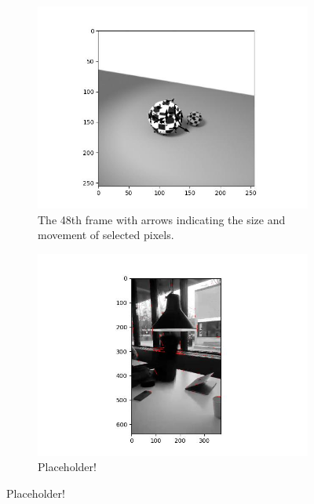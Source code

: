 \documentclass{article}
\begin{document}
\begin{figure}[H]
    \begin{subfigure}{.5\textwidth}
        \centering
        \includegraphics[scale=0.4]{code/toyProblem_F22_vectorField/48.jpg}
        \caption{The 48th frame with arrows indicating the size and movement of selected pixels.}
        \label{fig:moving-ball}
    \end{subfigure}%
    \begin{subfigure}{.5\textwidth}
        \centering
        \includegraphics[scale=0.4]{code/vanteImages_vectorField/32.jpg}
        \caption{Placeholder!}
        \label{fig:custom-video}
    \end{subfigure}
\end{figure}
\end{document}
